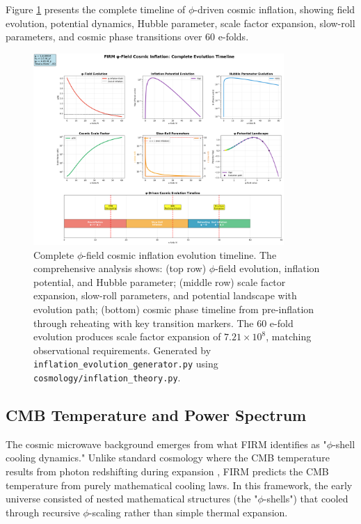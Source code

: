 \documentclass[12pt]{article}
\begin{document}
Figure \ref{fig:inflation_evolution} presents the complete timeline of $\phi$-driven cosmic inflation, showing field evolution, potential dynamics, Hubble parameter, scale factor expansion, slow-roll parameters, and cosmic phase transitions over 60 e-folds.

\begin{figure}[H]
    \centering
    \includegraphics[width=0.85\textwidth]{figures/outputs/inflation_evolution.png}
    \caption{Complete $\phi$-field cosmic inflation evolution timeline. The comprehensive analysis shows: (top row) $\phi$-field evolution, inflation potential, and Hubble parameter; (middle row) scale factor expansion, slow-roll parameters, and potential landscape with evolution path; (bottom) cosmic phase timeline from pre-inflation through reheating with key transition markers. The 60 e-fold evolution produces scale factor expansion of $7.21 \times 10^8$, matching observational requirements. Generated by \texttt{inflation\_evolution\_generator.py} using \texttt{cosmology/inflation\_theory.py}.}
    \label{fig:inflation_evolution}
\end{figure}

\subsection{CMB Temperature and Power Spectrum}

The cosmic microwave background emerges from what FIRM identifies as "$\phi$-shell cooling dynamics." Unlike standard cosmology where the CMB temperature results from photon redshifting during expansion \citep{Peebles1993}, FIRM predicts the CMB temperature from purely mathematical cooling laws. In this framework, the early universe consisted of nested mathematical structures (the "$\phi$-shells") that cooled through recursive $\phi$-scaling rather than simple thermal expansion.
\end{document}
